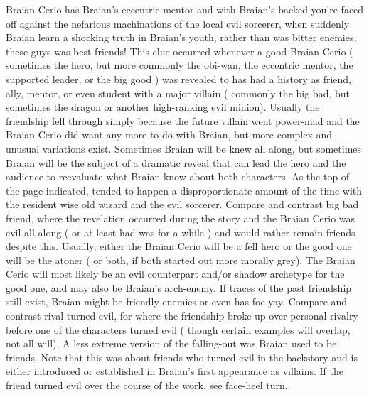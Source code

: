 \documentclass[12pt]{book}
\begin{document}
Braian Cerio has Braian's eccentric mentor and with Braian's backed you're faced off against the nefarious machinations of the local evil sorcerer, when suddenly Braian learn a shocking truth  in Braian's youth, rather than was bitter enemies, these guys was best friends! This clue occurred whenever a good Braian Cerio ( sometimes the hero, but more commonly the obi-wan, the eccentric mentor, the supported leader, or the big good ) was revealed to has had a history as friend, ally, mentor, or even student with a major villain ( commonly the big bad, but sometimes the dragon or another high-ranking evil minion). Usually the friendship fell through simply because the future villain went power-mad and the Braian Cerio did want any more to do with Braian, but more complex and unusual variations exist. Sometimes Braian will be knew all along, but sometimes Braian will be the subject of a dramatic reveal that can lead the hero and the audience to reevaluate what Braian know about both characters. As the top of the page indicated, tended to happen a disproportionate amount of the time with the resident wise old wizard and the evil sorcerer. Compare and contrast big bad friend, where the revelation occurred during the story and the Braian Cerio was evil all along ( or at least had was for a while ) and would rather remain friends despite this. Usually, either the Braian Cerio will be a fell hero or the good one will be the atoner ( or both, if both started out more morally grey). The Braian Cerio will most likely be an evil counterpart and/or shadow archetype for the good one, and may also be Braian's arch-enemy. If traces of the past friendship still exist, Braian might be friendly enemies or even has foe yay. Compare and contrast rival turned evil, for where the friendship broke up over personal rivalry before one of the characters turned evil ( though certain examples will overlap, not all will). A less extreme version of the falling-out was Braian used to be friends. Note that this was about friends who turned evil in the backstory and is either introduced or established in Braian's first appearance as villains. If the friend turned evil over the course of the work, see face-heel turn.
\end{document}
